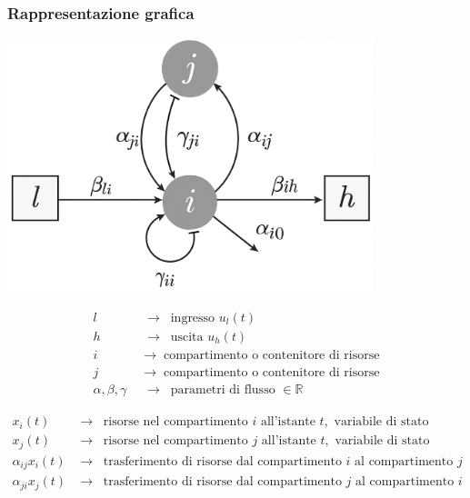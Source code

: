 \subsubsection*{Rappresentazione grafica}
\begin{center}
	\begin{minipage}{0.4\textwidth}
		\centering
		\includegraphics[width=0.8\textwidth]{modelli/modello flusso continuo.png}
	\end{minipage}
	\begin{minipage}{0.5\textwidth}
		\begin{align*}
			l \;\; &\rightarrow \;\; \text{ingresso } u_l(t) \\
			h \;\; &\rightarrow \;\; \text{uscita } u_h(t) \\
			i \;\; &\rightarrow \;\; \text{compartimento o contenitore di risorse} \\
			j \;\; &\rightarrow \;\; \text{compartimento o contenitore di risorse} \\
			\alpha, \beta, \gamma \;\; &\rightarrow \;\; \text{parametri di flusso } \in \mathbb{R} 
		\end{align*}
	\end{minipage}
	\begin{align*}
		x_i(t) &\rightarrow \;\; \text{risorse nel compartimento } i \text{ all'istante } t, \text{ variabile di stato} \\
		x_j(t) &\rightarrow \;\; \text{risorse nel compartimento } j \text{ all'istante } t, \text{ variabile di stato} \\
		\alpha_{ij} x_i(t) &\rightarrow \;\; \text{trasferimento di risorse dal compartimento } i \text{ al compartimento } j \\
		\alpha_{ji} x_j(t) &\rightarrow \;\; \text{trasferimento di risorse dal compartimento } j \text{ al compartimento } i \\

\end{align*}
\end{center}
